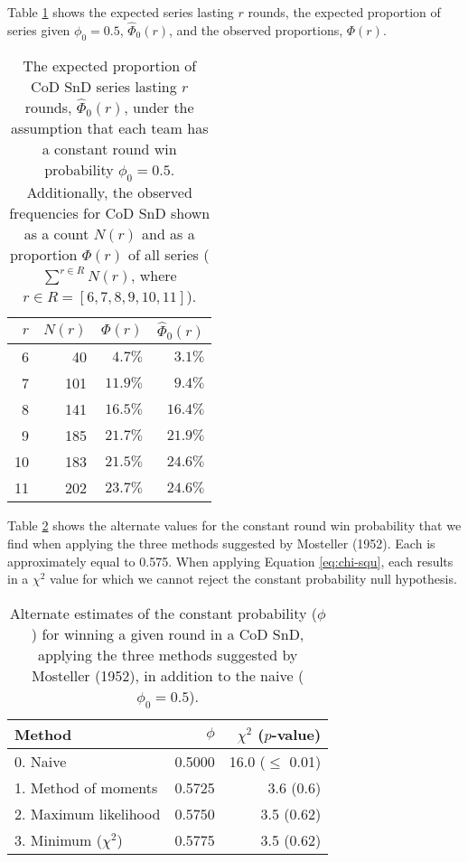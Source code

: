 \documentclass{article}
\begin{document}
Table \ref{tbl:cod-prob-series-lasting-r-rounds} shows the expected
series lasting \(r\) rounds, the expected proportion of series given
\(\phi_0 = 0.5\), \(\hat{\Phi}_0(r)\), and the observed proportions,
\(\Phi(r)\).

\begin{longtable}{rrrr}
\caption{The expected proportion of CoD SnD series lasting $r$ rounds, $\hat{\Phi}_0(r)$, under the assumption that each team has a constant round win probability $\phi_0 = 0.5$. Additionally, the observed frequencies for CoD SnD shown as a count $N(r)$ and as a proportion $\Phi(r)$ of all series ($\sum^{r \in R} N(r)$, where $r \in R = [6, 7, 8, 9, 10, 11]$).}\label{tbl:cod-prob-series-lasting-r-rounds} \\
\toprule
$r$ & $N(r)$ & $\Phi(r)$ & $\hat{\Phi}_0(r)$ \\ 
\midrule
6 & 40 & $4.7\%$ & $3.1\%$ \\ 
7 & 101 & $11.9\%$ & $9.4\%$ \\ 
8 & 141 & $16.5\%$ & $16.4\%$ \\ 
9 & 185 & $21.7\%$ & $21.9\%$ \\ 
10 & 183 & $21.5\%$ & $24.6\%$ \\ 
11 & 202 & $23.7\%$ & $24.6\%$ \\ 
\bottomrule
\end{longtable}

Table \ref{tbl:mosteller-methods-results} shows the alternate values for
the constant round win probability that we find when applying the three
methods suggested by Mosteller (1952). Each is approximately equal to
0.575. When applying Equation \ref{eq:chi-squ}, each results in a
\(\chi^2\) value for which we cannot reject the constant probability
null hypothesis.

\begin{longtable}{lrr}
\caption{Alternate estimates of the constant probability ($\phi$) for winning a given round in a CoD SnD, applying the three methods suggested by Mosteller (1952), in addition to the naive ($\phi_0 = 0.5$).}\label{tbl:mosteller-methods-results} \\
\toprule
Method & $\phi$ & $\chi^2$ ($p$-value) \\
\midrule
0. Naive & 0.5000 & 16.0 ($\leq$ 0.01) \\
1. Method of moments & 0.5725 & 3.6 (0.6) \\
2. Maximum likelihood & 0.5750 & 3.5 (0.62) \\
3. Minimum ($\chi^2$) & 0.5775 & 3.5 (0.62) \\
\bottomrule
\end{longtable}
\end{document}
